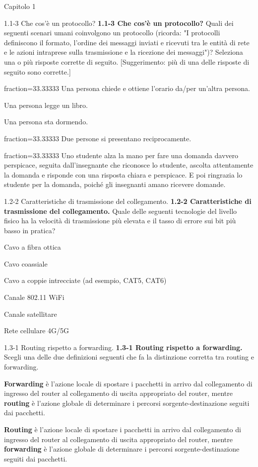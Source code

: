 \documentclass[a4paper]{article}
\begin{document}
\begin{quiz}{Capitolo 1}
\begin{multi}[points=1,multiple]{1.1-3 Che cos'è un protocollo?}
\textbf{1.1-3 Che cos'è un protocollo?} 
Quali dei seguenti scenari umani coinvolgono un protocollo 
(ricorda: "I protocolli definiscono il formato, l'ordine dei messaggi inviati e ricevuti tra le entità di rete e le azioni intraprese sulla trasmissione e la ricezione dei messaggi")? 
Seleziona una o più risposte corrette di seguito. [Suggerimento: più di una delle risposte di seguito sono corrette.]

\item[fraction=33.33333] Una persona chiede e ottiene l'orario da/per un'altra persona.
\item Una persona legge un libro.
\item Una persona sta dormendo.
\item[fraction=33.33333] Due persone si presentano reciprocamente.
\item[fraction=33.33333] Uno studente alza la mano per fare una domanda davvero perspicace, seguita dall'insegnante che riconosce lo studente, ascolta attentamente la domanda e risponde con una risposta chiara e perspicace. E poi ringrazia lo studente per la domanda, poiché gli insegnanti amano ricevere domande.
\end{multi}

\begin{multi}[points=1]{1.2-2 Caratteristiche di trasmissione del collegamento.}
\textbf{1.2-2 Caratteristiche di trasmissione del collegamento.}
Quale delle seguenti tecnologie del livello fisico ha la velocità di trasmissione più elevata e il tasso di errore sui bit più basso in pratica?
\item* Cavo a fibra ottica
\item Cavo coassiale
\item Cavo a coppie intrecciate (ad esempio, CAT5, CAT6)
\item Canale 802.11 WiFi
\item Canale satellitare
\item Rete cellulare 4G/5G
\end{multi}

\begin{multi}[points=1]{1.3-1 Routing rispetto a forwarding.}
\textbf{1.3-1 Routing rispetto a forwarding.} 
Scegli una delle due definizioni seguenti che fa la distinzione corretta tra routing e forwarding.
\item* \textbf{Forwarding} è l'azione locale di spostare i pacchetti in arrivo dal collegamento di ingresso del router al collegamento di uscita appropriato del router, mentre \textbf{routing} è l'azione globale di determinare i percorsi sorgente-destinazione seguiti dai pacchetti.
\item \textbf{Routing} è l'azione locale di spostare i pacchetti in arrivo dal collegamento di ingresso del router al collegamento di uscita appropriato del router, mentre \textbf{forwarding} è l'azione globale di determinare i percorsi sorgente-destinazione seguiti dai pacchetti.
\end{multi}


\end{quiz}
\end{document}
